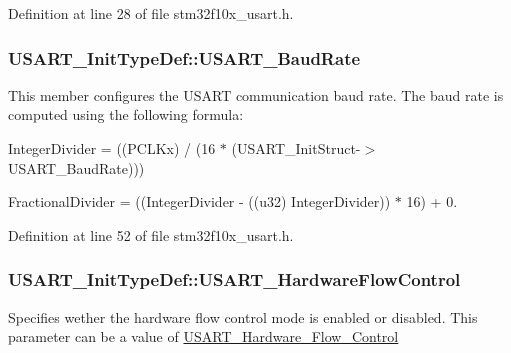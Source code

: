 Definition at line 28 of file stm32f10x\+\_\+usart.\+h.

\subsubsection[{\texorpdfstring{U\+S\+A\+R\+T\+\_\+\+Baud\+Rate}{USART_BaudRate}}]{ U\+S\+A\+R\+T\+\_\+\+Init\+Type\+Def\+::\+U\+S\+A\+R\+T\+\_\+\+Baud\+Rate}\hypertarget{struct_u_s_a_r_t___init_type_def_a6f763cb0e6044f838ee764ce437997b2}{}\label{struct_u_s_a_r_t___init_type_def_a6f763cb0e6044f838ee764ce437997b2}
This member configures the U\+S\+A\+RT communication baud rate. The baud rate is computed using the following formula\+:
\begin{DoxyItemize}
\item Integer\+Divider = ((P\+C\+L\+Kx) / (16 $\ast$ (U\+S\+A\+R\+T\+\_\+\+Init\+Struct-\/$>$U\+S\+A\+R\+T\+\_\+\+Baud\+Rate)))
\item Fractional\+Divider = ((Integer\+Divider -\/ ((u32) Integer\+Divider)) $\ast$ 16) + 0. 
\end{DoxyItemize}

Definition at line 52 of file stm32f10x\+\_\+usart.\+h.

\subsubsection[{\texorpdfstring{U\+S\+A\+R\+T\+\_\+\+Hardware\+Flow\+Control}{USART_HardwareFlowControl}}]{ U\+S\+A\+R\+T\+\_\+\+Init\+Type\+Def\+::\+U\+S\+A\+R\+T\+\_\+\+Hardware\+Flow\+Control}\hypertarget{struct_u_s_a_r_t___init_type_def_a54feb80b22c0fd865f321ef3408bf79d}{}\label{struct_u_s_a_r_t___init_type_def_a54feb80b22c0fd865f321ef3408bf79d}
Specifies wether the hardware flow control mode is enabled or disabled. This parameter can be a value of \hyperlink{group___u_s_a_r_t___hardware___flow___control}{U\+S\+A\+R\+T\+\_\+\+Hardware\+\_\+\+Flow\+\_\+\+Control} 

